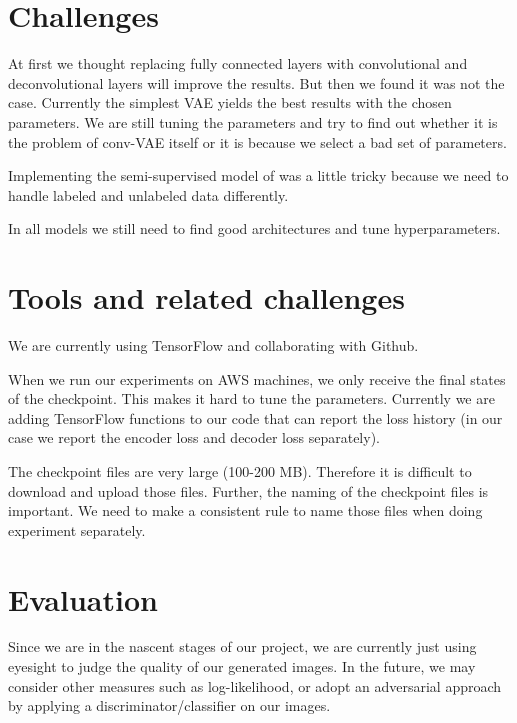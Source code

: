 \documentclass[11pt]{article}
\begin{document}
\section*{Challenges}

At first we thought replacing fully connected layers with convolutional and deconvolutional layers will improve the results. But then we found it was not the case. Currently the simplest VAE yields the best results with the chosen parameters. We are still tuning the parameters and try to find out whether it is the problem of conv-VAE itself or it is because we select a bad set of parameters.

Implementing the semi-supervised model of \cite{DBLP:journals/corr/KingmaRMW14} was a little tricky because we need to handle labeled and unlabeled data differently.

In all models we still need to find good architectures and tune hyperparameters.



\section*{Tools and related challenges}
We are currently using TensorFlow and collaborating with Github.

When we run our experiments on AWS machines, we only receive the final states of the checkpoint. This makes it hard to tune the parameters. Currently we are adding TensorFlow functions to our code that can report the loss history (in our case we report the encoder loss and decoder loss separately).

The checkpoint files are very large (100-200 MB). Therefore it is difficult to download and upload those files. Further, the naming of the checkpoint files is important. We need to make a consistent rule to name those files when doing experiment separately.

\section*{Evaluation}

Since we are in the nascent stages of our project, we are currently just using eyesight to judge the quality of our generated images. In the future, we may consider other measures such as log-likelihood, or adopt an adversarial approach by applying a discriminator/classifier on our images.




\nocite{*}
\end{document}
